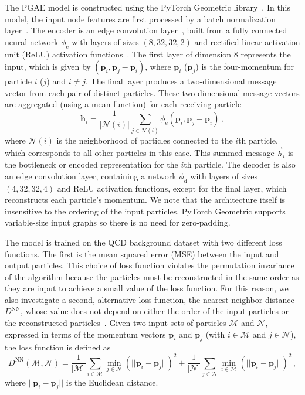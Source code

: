 \documentclass[letterpaper,11pt]{article}
\begin{document}
The PGAE model is constructed using the PyTorch Geometric library~\cite{PyTorchGeometric}.
In this model, the input node features are first processed by a batch normalization layer~\cite{batchnorm}.
The encoder is an edge convolution layer~\cite{DGCNN}, built from a fully connected neural network $\phi_\mathrm{e}$ with layers of sizes $(8, 32, 32, 2)$ and rectified linear activation unit (ReLU) activation functions~\cite{relu}.
The first layer of dimension $8$ represents the input, which is given by $(\boldsymbol{p}_i, \boldsymbol{p}_j-\boldsymbol{p}_i)$, where $\boldsymbol{p}_i$ ($\boldsymbol{p}_j$) is the four-momentum for particle $i$ ($j$) and $i\neq j$.
The final layer produces a two-dimensional message vector from each pair of distinct particles.
These two-dimensional message vectors are aggregated (using a mean function) for each receiving particle
\begin{equation}
\boldsymbol{h}_i = \frac{1}{|\mathcal N(i)|}\sum_{j\in \mathcal N(i)} \phi_\mathrm{e}(\boldsymbol{p}_i, \boldsymbol{p}_j-\boldsymbol{p}_i)\,,
\end{equation}
where $\mathcal N(i)$ is the neighborhood of particles connected to the $i$th particle, which corresponds to all other particles in this case.
This summed message $\vec h_i$ is the bottleneck or encoded representation for the $i$th particle.
The decoder is also an edge convolution layer, containing a network $\phi_\mathrm{d}$ with layers of sizes $(4, 32, 32, 4)$ and ReLU activation functions, except for the final layer, which reconstructs each particle's momentum.
We note that the architecture itself is insensitive to the ordering of the input particles. 
PyTorch Geometric supports variable-size input graphs so there is no need for zero-padding.

The model is trained on the QCD background dataset with two different loss functions. 
The first is the mean squared error (MSE) between the input and output particles. 
This choice of loss function violates the permutation invariance of the algorithm because the particles must be reconstructed in the same order as they are input to achieve a small value of the loss function.
For this reason, we also investigate a second, alternative loss function, the nearest neighbor distance $D^\mathrm{NN}$, whose value does not depend on either the order of the input particles or the reconstructed particles~\cite{sparsegen_vae}.
Given two input sets of particles $\mathcal{M}$ and $\mathcal{N}$, expressed in terms of the momentum vectors $\boldsymbol{p}_i$ and $\boldsymbol{p}_j$ (with $i \in \mathcal{M}$ and $j \in \mathcal{N}$), the loss function is defined as
\begin{equation}
D^\mathrm{NN}(\mathcal{M}, \mathcal{N}) =  \frac{1}{|\mathcal{M}|}\sum_{i \in \mathcal{M}} \min_{j \in \mathcal{N}} \left(||\boldsymbol{p}_i - \boldsymbol{p}_j||\right)^2 + \frac{1}{|\mathcal{N}|}\sum_{j \in \mathcal{N}} \min_{i \in \mathcal{M}} \left(||\boldsymbol{p}_i - \boldsymbol{p}_j||\right)^2\,,
\label{eq:L_NND}
\end{equation}
where $||\boldsymbol{p}_i-\boldsymbol{p}_j||$ is the Euclidean distance.
\end{document}
